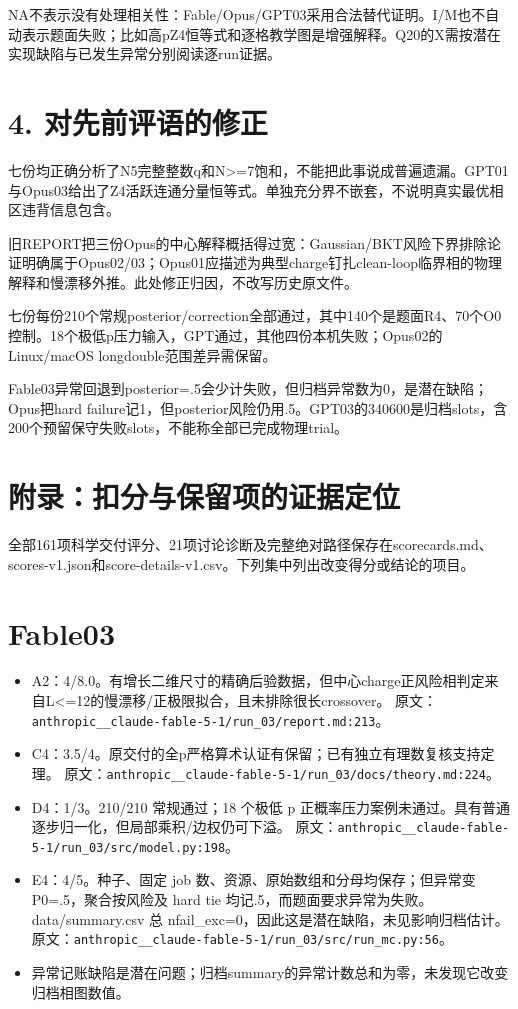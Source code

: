 \documentclass[11pt,a4paper]{article}
\begin{document}
NA不表示没有处理相关性：Fable/Opus/GPT03采用合法替代证明。I/M也不自动表示题面失败；比如高pZ4恒等式和逐格教学图是增强解释。Q20的X需按潜在实现缺陷与已发生异常分别阅读逐run证据。

\section*{4. 对先前评语的修正}

七份均正确分析了N5完整整数q和N>=7饱和，不能把此事说成普遍遗漏。GPT01与Opus03给出了Z4活跃连通分量恒等式。单独充分界不嵌套，不说明真实最优相区违背信息包含。

旧REPORT把三份Opus的中心解释概括得过宽：Gaussian/BKT风险下界排除论证明确属于Opus02/03；Opus01应描述为典型charge钉扎clean-loop临界相的物理解释和慢漂移外推。此处修正归因，不改写历史原文件。

七份每份210个常规posterior/correction全部通过，其中140个是题面R4、70个O0控制。18个极低p压力输入，GPT通过，其他四份本机失败；Opus02的Linux/macOS longdouble范围差异需保留。

Fable03异常回退到posterior=.5会少计失败，但归档异常数为0，是潜在缺陷；Opus把hard failure记1，但posterior风险仍用.5。GPT03的340600是归档slots，含200个预留保守失败slots，不能称全部已完成物理trial。

\section*{附录：扣分与保留项的证据定位}

全部161项科学交付评分、21项讨论诊断及完整绝对路径保存在scorecards.md、scores-v1.json和score-details-v1.csv。下列集中列出改变得分或结论的项目。

\section*{Fable03}

\begin{itemize}
\item A2：4/8.0。有增长二维尺寸的精确后验数据，但中心charge正风险相判定来自L<=12的慢漂移/正极限拟合，且未排除很长crossover。 原文：\nolinkurl{anthropic__claude-fable-5-1/run_03/report.md:213}。
\item C4：3.5/4。原交付的全p严格算术认证有保留；已有独立有理数复核支持定理。 原文：\nolinkurl{anthropic__claude-fable-5-1/run_03/docs/theory.md:224}。
\item D4：1/3。210/210 常规通过；18 个极低 p 正概率压力案例未通过。具有普通逐步归一化，但局部乘积/边权仍可下溢。 原文：\nolinkurl{anthropic__claude-fable-5-1/run_03/src/model.py:198}。
\item E4：4/5。种子、固定 job 数、资源、原始数组和分母均保存；但异常变 P0=.5，聚合按风险及 hard tie 均记.5，而题面要求异常为失败。data/summary.csv 总 nfail\_exc=0，因此这是潜在缺陷，未见影响归档估计。 原文：\nolinkurl{anthropic__claude-fable-5-1/run_03/src/run_mc.py:56}。
\item 异常记账缺陷是潜在问题；归档summary的异常计数总和为零，未发现它改变归档相图数值。
\end{itemize}
\end{document}

